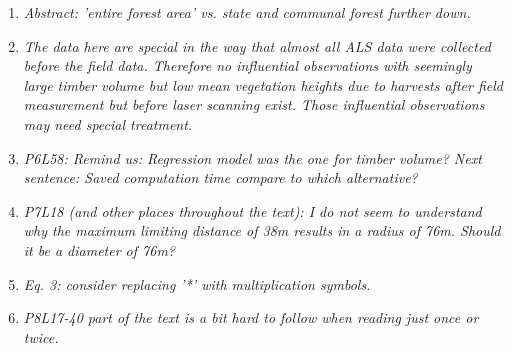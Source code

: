 \documentclass{article}
\begin{document}
\begin{enumerate}

  \item \textit{Abstract: 'entire forest area' vs. state and communal forest further down.}
  
  
  
  \item \textit{The data here are special in the way that almost all ALS data were collected before the field data. Therefore no influential observations with seemingly large timber volume but low mean vegetation heights due to harvests after field measurement but before laser scanning exist. Those influential observations may need special treatment.}
  
  
   \item \textit{P6L58: Remind us: Regression model was the one for timber volume? Next sentence: Saved computation time compare to which alternative?
   }
   
   
   \item \textit{P7L18 (and other places throughout the text): I do not seem to understand why the maximum limiting distance of 38m results in a radius of 76m. Should it be a diameter of 76m?   }
   
   
   \item \textit{  Eq. 3: consider replacing '*' with multiplication symbols. }
   
   
   
   \item \textit{P8L17-40 part of the text is a bit hard to follow when reading just once or twice.}
   

\end{enumerate}
\end{document}
